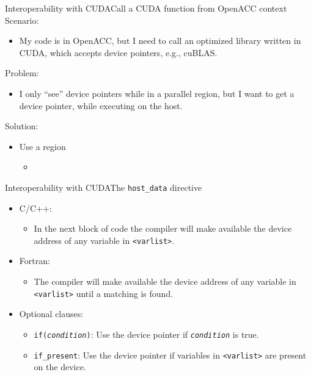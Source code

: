 \documentclass[12pt,aspectratio=169]{beamer}
\begin{document}
\begin{frame}[fragile]{Interoperability with CUDA}{Call a CUDA function from OpenACC context}
  Scenario:
  \begin{itemize}
  \item My code is in OpenACC, but I need to call an optimized library written in CUDA, which accepts device pointers, e.g., cuBLAS.
  \end{itemize}
  \pause
  Problem:
  \begin{itemize}
  \item I only ``see'' device pointers while in a parallel region, but I want to get a device pointer, while executing on the host.
  \end{itemize}
  \pause
  Solution:
  \begin{itemize}
  \item Use a  region
    \begin{itemize}
    \item {}
    \end{itemize}
  \end{itemize}
\end{frame}

\begin{frame}[fragile]{Interoperability with CUDA}{The \texttt{host\_data} directive}
  \begin{itemize}
  \item C/C++: 
    \begin{itemize}
    \item In the next block of code the compiler will make available the device address of any variable in \texttt{<varlist>}.
    \end{itemize}
  \item Fortran: 
    \begin{itemize}
    \item The compiler will make available the device address of any variable in \texttt{<varlist>} until a matching  is found.
    \end{itemize}
  \item Optional clauses:
    \begin{itemize}
    \item \texttt{if(\emph{condition})}: Use the device pointer if \texttt{\emph{condition}} is true.
    \item \texttt{if\_present}: Use the device pointer if variables in \texttt{<varlist>} are present on the device.
    \end{itemize}
  \end{itemize}
\end{frame}
\end{document}
